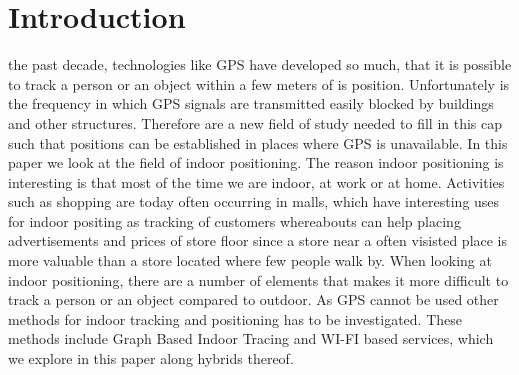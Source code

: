 \section{Introduction}
 the past decade, technologies like GPS have developed so much, that it is possible to track a person or an object within a few meters of is position. 
Unfortunately is the frequency in which GPS signals are transmitted easily blocked by buildings and other structures. 
Therefore are a new field of study needed to fill in this cap such that positions can be established in places where GPS is unavailable.
In this paper we look at the field of indoor positioning. 
The reason indoor positioning is interesting is that most of the time we are indoor, at work or at home. 
Activities such as shopping are today often occurring in malls, which have interesting uses for indoor positing as tracking of customers whereabouts can help placing advertisements and prices of store floor since a store near a often visisted place is more valuable than a store located where few people walk by. 
When looking at indoor positioning, there are a number of elements that makes it more difficult to track a person or an object compared to outdoor.
As GPS cannot be used other methods for indoor tracking and positioning has to be investigated. 
These methods include Graph Based Indoor Tracing and WI-FI based services, which we explore in this paper along hybrids thereof.  




